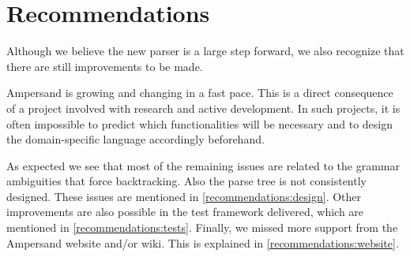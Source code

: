 
\section{Recommendations}
\label{sec:recommendations}
Although we believe the new parser is a large step forward, we also recognize that there are still improvements to be made.

Ampersand is growing and changing in a fast pace.
This is a direct consequence of a project involved with research and active development.
In such projects, it is often impossible to predict which functionalities will be necessary and to design the domain-specific language accordingly beforehand.

As expected we see that most of the remaining issues are related to the grammar ambiguities that force backtracking.
Also the parse tree is not consistently designed.
These issues are mentioned in \autoref{recommendations:design}.
Other improvements are also possible in the test framework delivered, which are mentioned in \autoref{recommendations:tests}.
Finally, we missed more support from the Ampersand website and/or wiki.
This is explained in \autoref{recommendations:website}.




